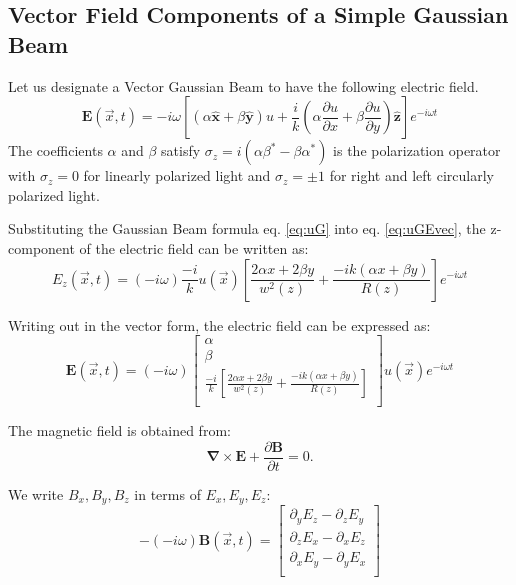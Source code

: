 \documentclass[11pt,letterpaper]{article}
\newcommand{\p}{\partial}
\newcommand{\del}{\boldsymbol\nabla}
\begin{document}
\subsection{Vector Field Components of a Simple Gaussian Beam}
Let us designate a Vector Gaussian Beam to have the following electric field.
\begin{equation} \label{eq:uGEvec}
\mathbf{E} (\vec{x},t) = -i \omega 
\left[ 
(\alpha \mathbf{\hat{x}} + \beta \mathbf{\hat{y}}) u
+\frac{i}{k} \left( \alpha \frac{\partial u}{\partial x} + \beta \frac{\partial u}{\partial y} \right) \mathbf{\hat{z}} 
	\right] 	e^{-i\omega t}
\end{equation}
The coefficients $\alpha$ and $\beta$ satisfy $\sigma_z=i(\alpha\beta^{\ast} -\beta\alpha^{\ast})$ is the polarization operator with $\sigma_z=0$ for linearly polarized light and $\sigma_z=\pm 1$ for right and left circularly polarized light. 

Substituting the Gaussian Beam formula eq. \ref{eq:uG} into eq. \ref{eq:uGEvec}, the z-component of the electric field can be written as:
\begin{equation}\label{eq:uGEz}
E_z(\vec{x},t) =( -i \omega ) \frac{-i}{k} u(\vec{x})\left[
\frac{2 \alpha x + 2 \beta y}{w^2(z)}
+
\frac{-i k (\alpha x + \beta y)}{R(z)}
\right]	e^{-i\omega t}
\end{equation}

Writing out in the vector form, the electric field can be expressed as:
\begin{equation}
\mathbf{E}(\vec{x},t)=(-i\omega) 
\left[
\begin{matrix}
\alpha  \\
\beta  \\
\frac{-i}{k}\left[
\frac{2 \alpha x + 2 \beta y}{w^2(z)}
+
\frac{-i k (\alpha x + \beta y)}{R(z)}
\right]
\\
\end{matrix}
\right]
u(\vec{x})	e^{-i\omega t}
\end{equation}


The magnetic field is obtained from:
\begin{equation}
\del \times \mathbf{E} + \frac{\p \mathbf{B}}{\p t}=0.
\end{equation}

We write ${B_x,B_y,B_z}$ in terms of ${E_x,E_y,E_z}$:
\begin{equation}
-(-i\omega)\mathbf{B}(\vec{x},t)=
\left[
\begin{matrix}
\p_y E_z-\p_z E_y \\
\p_z E_x-\p_x E_z \\
\p_x E_y-\p_y E_x \\
\end{matrix}
\right]
\end{equation}
\clearpage
\end{document}
